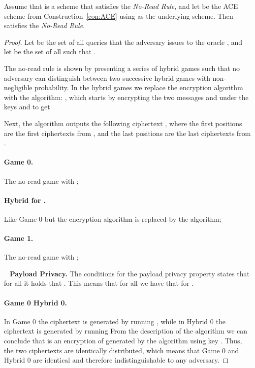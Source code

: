 \documentclass{llncs}
\begin{document}
\begin{thm} \label{thm:no-read}
Assume that  is a \oACE scheme that satisfies the \emph{No-Read Rule}, and let  be the ACE scheme from Construction~\ref{con:ACE} using  as the underlying \oACE scheme. Then  satisfies the \emph{No-Read Rule}.
\end{thm}

\begin{proof}
Let  be the set of all queries  that the adversary issues to the oracle , and let  be the set of all  such that . 

The no-read rule is shown by presenting a series of hybrid games such that no adversary can distinguish between two successive hybrid games with non-negligible probability.
In the hybrid games we  replace the encryption algorithm with the algorithm: , which starts by encrypting the two messages  and  under the keys  and  to get 

Next, the algorithm outputs the following ciphertext , where the first  positions are the first  \oACE ciphertexts from , and the last  positions are the last  \oACE ciphertexts from .

\paragraph{Game 0.} The no-read game with ;
\paragraph{Hybrid  for .} Like Game 0 but the encryption algorithm is replaced by the  algorithm;
\paragraph{Game 1.} The no-read game with ;


\ \newline
\noindent\textbf{Payload Privacy.} 
The conditions for the payload privacy property states that for all  it holds that .
This means that for all  we have that  for .

\paragraph{Game 0  Hybrid 0.} 
In  Game 0 the ciphertext is generated by running , while in Hybrid 0 the ciphertext is generated by running 
From the description of the algorithm  we can conclude that  is an encryption of  generated by the  algorithm using key .
Thus, the two ciphertexts are identically distributed, which means that Game 0 and Hybrid 0 are identical and therefore indistinguishable to any adversary.


\end{proof}
\end{document}
